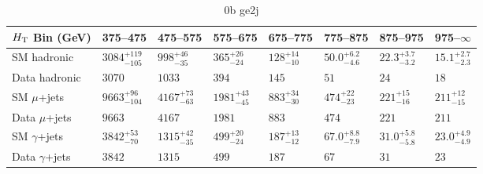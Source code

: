 \documentclass[8pt]{article}
\def\scalht{\mbox{$H_{\rm{T}}$}\xspace}
\newcommand\T{\rule{0pt}{2.6ex}}
\newcommand\B{\rule[-1.2ex]{0pt}{0pt}}
\begin{document}
\begin{table}[ht!]
\caption{0b ge2j}
\label{tab:ensemble-0b ge2j}
\centering
\begin{tabular}{ llllllll }

\hline
\scalht Bin (GeV)       & 375--475                       & 475--575                       & 575--675                       & 675--775                       & 775--875                       & 875--975                       & 975--$\infty$                  \\ [1.000000ex]
\hline
SM hadronic\T           & $3084^{+119}_{-105}$           & $998^{+46}_{-35}$              & $365^{+26}_{-24}$              & $128^{+14}_{-10}$              & $50.0^{+6.2}_{-4.6}$           & $22.3^{+3.7}_{-3.2}$           & $15.1^{+2.7}_{-2.3}$           \\ 
Data hadronic\B         & $3070$                         & $1033$                         & $394$                          & $145$                          & $51$                           & $24$                           & $18$                           \\ 
\hline
SM $\mu$+jets\T         & $9663^{+96}_{-104}$            & $4167^{+73}_{-63}$             & $1981^{+43}_{-45}$             & $883^{+34}_{-30}$              & $474^{+22}_{-23}$              & $221^{+15}_{-16}$              & $211^{+12}_{-15}$              \\ 
Data $\mu$+jets\B       & $9663$                         & $4167$                         & $1981$                         & $883$                          & $474$                          & $221$                          & $211$                          \\ 
\hline
SM $\gamma$+jets\T      & $3842^{+53}_{-70}$             & $1315^{+42}_{-35}$             & $499^{+20}_{-24}$              & $187^{+13}_{-12}$              & $67.0^{+8.8}_{-7.9}$           & $31.0^{+5.8}_{-5.8}$           & $23.0^{+4.9}_{-4.9}$           \\ 
Data $\gamma$+jets\B    & $3842$                         & $1315$                         & $499$                          & $187$                          & $67$                           & $31$                           & $23$                           \\ 
\hline

\end{tabular}
\end{table}
\end{document}
